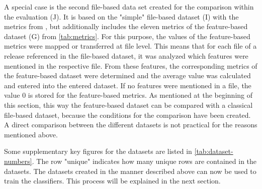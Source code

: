 A special case is the second file-based data set created for the comparison within the evaluation (J). It is based on the "simple" file-based dataset (I) with the metrics from \cite{Moser2008}, but additionally includes the eleven metrics of the feature-based dataset (G) from \autoref{tab:metrics}. For this purpose, the values of the feature-based metrics were mapped or transferred at file level. This means that for each file of a release referenced in the file-based dataset, it was analyzed which features were mentioned in the respective file. From these features, the corresponding metrics of the feature-based dataset were determined and the average value was calculated and entered into the entered dataset. If no features were mentioned in a file, the value $0$ is stored for the feature-based metrics. As mentioned at the beginning of this section, this way the feature-based dataset can be compared with a classical file-based dataset, because the conditions for the comparison have been created. A direct comparison between the different datasets is not practical for the reasons mentioned above.

Some supplementary key figures for the datasets are listed in \autoref{tab:dataset-numbers}. The row "unique" indicates how many unique rows are contained in the datasets. The datasets created in the manner described above can now be used to train the classifiers. This process will be explained in the next section.

